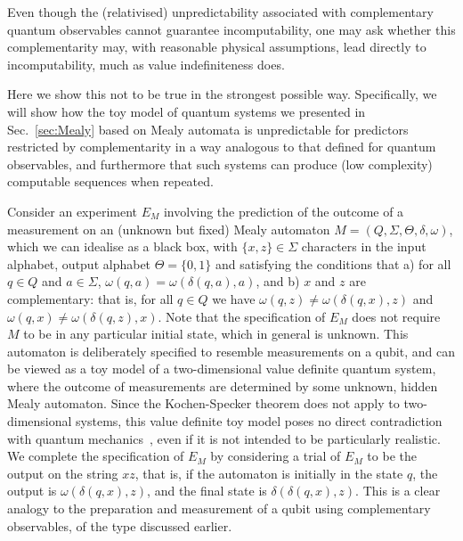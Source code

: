 \documentclass[information,article,submit,moreauthors,pdftex,12pt,a4paper]{mdpi}
\theoremstyle{mdpi}
\newcounter{ex}
\newcounter{re}
\theoremstyle{mdpidefinition}
\begin{document}
Even though the (relativised) unpredictability associated with complementary quantum observables cannot guarantee incomputability, one may ask whether this complementarity may, with reasonable physical assumptions, lead directly to incomputability, much as value indefiniteness does.

Here we show this not to be true in the strongest possible way.
Specifically, we will show how the toy model of quantum systems we presented in Sec.~\ref{sec:Mealy} based on Mealy automata is unpredictable for predictors restricted by complementarity in a way analogous to that defined for quantum observables, and furthermore that such systems can produce (low complexity) computable sequences when repeated.

Consider an experiment $E_M$ involving the prediction of the outcome of a measurement on an (unknown but fixed) Mealy automaton $M=(Q,\Sigma,\Theta,\delta,\omega)$, which we can idealise as a black box, with $\{x,z\}\in \Sigma$ characters in the input alphabet, output alphabet $\Theta=\{0,1\}$ and satisfying the conditions that
a) for all $q\in Q$ and $a\in\Sigma$, $\omega(q,a)=\omega(\delta(q,a),a)$,
and b) $x$ and $z$ are complementary:
that is, for all $q\in Q$ we have $\omega(q,z)\neq \omega(\delta(q,x),z)$ and $\omega(q,x)\neq \omega(\delta(q,z),x)$.
Note that the specification of $E_M$ does not require $M$ to be in any particular initial state, which in general is unknown.
This automaton is deliberately specified to resemble measurements on a qubit, and can be viewed as a toy model of a two-dimensional value definite quantum system, where the outcome of measurements are determined by some unknown, hidden Mealy automaton.
Since the Kochen-Specker theorem does not apply to two-dimensional systems, this value definite toy model poses no direct contradiction with quantum mechanics~\cite{kochen1}, even if it is not intended to be particularly realistic.
We complete the specification of $E_M$ by considering a trial of $E_M$ to be the output on the string $xz$, that is, if the automaton is initially in the state $q$, the output is $\omega(\delta(q,x),z)$, and the final state is $\delta(\delta(q,x),z)$.
This is a clear analogy to the preparation and measurement of a qubit using complementary observables, of the type discussed earlier.
\end{document}
